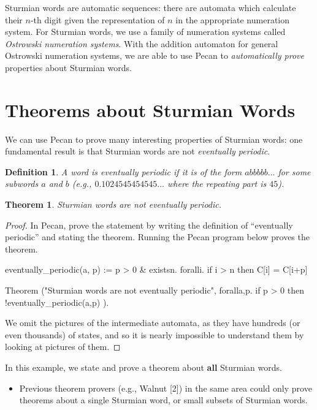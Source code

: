 \documentclass[landscape,usenames,dvipsnames, 25pt]{sciposter}
\newtheorem*{thm*}{Theorem}
\newtheorem*{defin}{Definition}
\begin{document}
\begin{multicols}{3}
Sturmian words are automatic sequences: there are automata which calculate their $n$-th digit given the representation of $n$ in the appropriate numeration system.
For Sturmian words, we use a family of numeration systems called \emph{Ostrowski numeration systems}.
With the addition automaton for general Ostrowski numeration systems, we are able to use Pecan to \emph{automatically prove} properties about Sturmian words. 

\columnbreak

\section*{Theorems about Sturmian Words}

We can use Pecan to prove many interesting properties of Sturmian words:
one fundamental result is that Sturmian words are not \emph{eventually periodic}.
\begin{mdframed}[style=MyFrame]
\begin{defin}
    A word is \emph{eventually periodic} if it is of the form $abbbbb \ldots$ for some subwords $a$ and $b$ (e.g., $0.1024545454545\ldots$ where the repeating part is $45$).
\end{defin}

\begin{thm*}
Sturmian words are not eventually periodic.
\end{thm*}

\begin{proof}
In Pecan, prove the statement by writing the definition of ``eventually periodic'' and stating the theorem.
Running the Pecan program below proves the theorem.
\begin{pecan}
eventually_periodic(a, p) := 
    p > 0 & existsn. foralli. if i > n then C[i] = C[i+p]
    
Theorem ("Sturmian words are not eventually periodic", { 
    foralla,p. if p > 0 then !eventually_periodic(a,p) 
}).
\end{pecan}
We omit the pictures of the intermediate automata, as they have hundreds (or even thousands) of states, and so it is nearly impossible to understand them by looking at pictures of them.
\end{proof}
\end{mdframed}


In this example, we state and prove a theorem about \textbf{all} Sturmian words.
\begin{itemize}
    \item Previous theorem provers (e.g., Walnut [2]) in the same area could only prove theorems about a single Sturmian word, or small subsets of Sturmian words.
\end{itemize}
        

\end{multicols}
\end{document}
